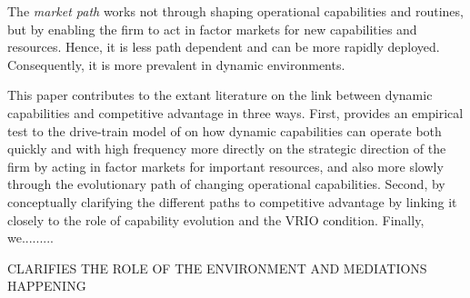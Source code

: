 \documentclass[review,fleqn]{elsarticle}\usepackage[]{graphicx}\usepackage[]{color}
\begin{document}
The \emph{market path} works not through shaping operational capabilities and routines,
but by enabling the firm to act in factor markets for new capabilities and
resources. Hence, it is less path dependent and can be more rapidly
deployed. Consequently, it is more prevalent in dynamic environments.

This paper contributes to the extant literature on the link between dynamic capabilities
and competitive advantage in three ways. First, provides an empirical test to the
drive-train model of \cite{DiStefano2014} on how dynamic capabilities can operate both
quickly and with high frequency more directly on the strategic direction of the firm by
acting in factor markets for important resources, and also more slowly through the
evolutionary path of changing operational capabilities. Second, by conceptually clarifying
the different paths to competitive advantage by linking it closely to the role of
capability evolution and the VRIO condition. Finally, we.........

CLARIFIES THE ROLE OF THE ENVIRONMENT AND MEDIATIONS HAPPENING





\end{document}

